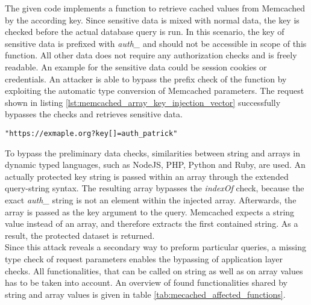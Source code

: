 The given code implements a function to retrieve cached values from Memcached by the according key. Since sensitive data is mixed with normal data, the key is checked before the actual database query is run. In this scenario, the key of sensitive data is prefixed with \emph{auth\_} and should not be accessible in scope of this function. All other data does not require any authorization checks and is freely readable. An example for the sensitive data could be session cookies or credentials. An attacker is able to bypass the prefix check of the function by exploiting the automatic type conversion of Memcached parameters. The request shown in listing \ref{lst:memcached_array_key_injection_vector} successfully bypasses the checks and retrieves sensitive data. \\

\begin{lstlisting}[caption={Attack vectors against Memcached for array key injection via the query-string parameter}, label={lst:memcached_array_key_injection_vector}]
"https://exmaple.org?key[]=auth_patrick"
\end{lstlisting}

To bypass the preliminary data checks, similarities between string and arrays in dynamic typed languages, such as NodeJS, PHP, Python and Ruby, are used. An actually protected key string is passed within an array through the extended query-string syntax. The resulting array bypasses the \emph{indexOf} check, because the exact \emph{auth\_} string is not an element within the injected array. Afterwards, the array is passed as the key argument to the query. Memcached expects a string value instead of an array, and therefore extracts the first contained string. As a result, the protected dataset is returned.\\

Since this attack reveals a secondary way to preform particular queries, a missing type check of request parameters enables the bypassing of application layer checks. All functionalities, that can be called on string as well as on array values has to be taken into account. An overview of found functionalities shared by string and array values is given in table \ref{tab:mecached_affected_functions}.

